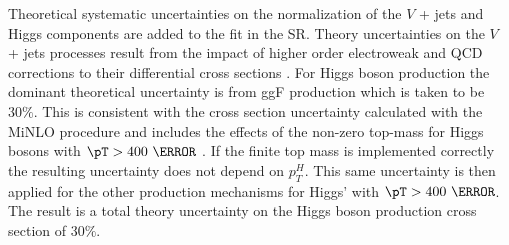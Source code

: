 Theoretical systematic uncertainties on the normalization of the $V$ + jets and
Higgs components are added to the fit in the SR.  Theory uncertainties on the
$V$ + jets processes result from the impact of higher order electroweak and QCD
corrections to their differential cross sections \cite{Lindert:2017olm}. For
Higgs boson production the dominant theoretical uncertainty is from ggF
production which is taken to be $30\%$.  This is consistent with the cross
section uncertainty calculated with the MiNLO procedure and includes the
effects of the non-zero top-mass for Higgs bosons with $\pT > 400~\GeV$
\cite{Jones:2018hbb}.  If the finite top mass is implemented correctly the
resulting uncertainty does not depend on $p_{T}^{H}$.  This same uncertainty is
then applied for the other production mechanisms for Higgs' with $\pT >
400~\GeV$.  The result is a total theory uncertainty on the Higgs boson
production cross section of $30\%$.
